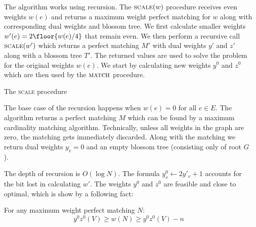 The algorithm works using recursion. The $\textsc{scale}(w)$ procedure receives even weights $w(e)$ and returns a maximum weight perfect matching for $w$ along with corresponding dual weights and blossom tree. We first calculate smaller weights $w'(e) = 2\floor{ w(e)/4 }$ that remain even. We then perform a recursive call $\textsc{scale}(w')$ which returns a perfect matching $M'$ with dual weights $y'$ and $z'$ along with a blossom tree $T'$. The returned values are used to solve the problem for the original weights $w(e)$. We start by calculating new weights $y^0$ and $z^0$ which are then used by the $\textsc{match}$ procedure.

\begin{algorithm}
\caption{The \textsc{scale} procedure}\label{alg:scale}
\begin{algorithmic}[1]
\EndIf
{}
\EndProcedure
\end{algorithmic}
\end{algorithm}

The base case of the recursion happens when $w(e) = 0$ for all $e \in E$. The algorithm returns a perfect matching $M$ which can be found by a maximum cardinality matching algorithm. Technically, unless all weights in the graph are zero, the matching gets immediately discarded. Along with the matching we return dual weights $y_v = 0$ and an empty blossom tree (consisting only of root $G$).

The depth of recursion is $O(\log N)$. The formula $y^0_v \gets 2y'_v + 1$ accounts for the bit lost in calculating $w'$. The weights $y^0$ and $z^0$ are feasible and close to optimal, which is show by a following fact:

\begin{theorem}
    For any maximum weight perfect matching $N$:
    \begin{equation}\label{eq:3}
        y^0z^0(V) \geq w(N) \geq y^0z^0(V) - n
    \end{equation}    
\end{theorem}

